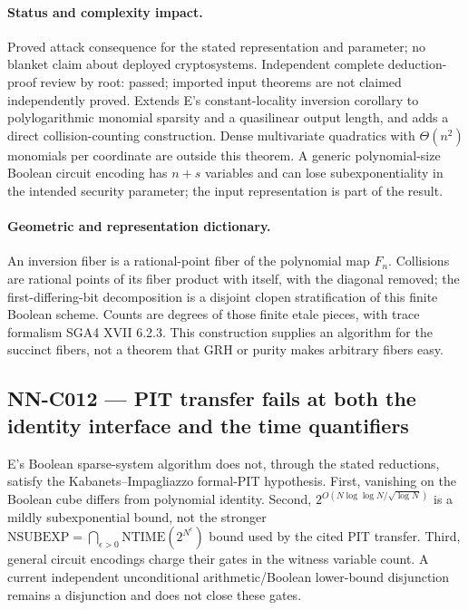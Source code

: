 \paragraph{Status and complexity impact.}
Proved attack consequence for the stated representation and parameter; no blanket claim about deployed cryptosystems. Independent complete deduction-proof review by root: passed; imported input theorems are not claimed independently proved. Extends E's constant-locality inversion corollary to polylogarithmic monomial sparsity and a quasilinear output length, and adds a direct collision-counting construction. Dense multivariate quadratics with $\Theta(n^2)$ monomials per coordinate are outside this theorem. A generic polynomial-size Boolean circuit encoding has $n+s$ variables and can lose subexponentiality in the intended security parameter; the input representation is part of the result.

\paragraph{Geometric and representation dictionary.}
An inversion fiber is a rational-point fiber of the polynomial map $F_n$. Collisions are rational points of its fiber product with itself, with the diagonal removed; the first-differing-bit decomposition is a disjoint clopen stratification of this finite Boolean scheme. Counts are degrees of those finite etale pieces, with trace formalism SGA4 XVII 6.2.3. This construction supplies an algorithm for the succinct fibers, not a theorem that GRH or purity makes arbitrary fibers easy.

\subsection{NN-C012 --- PIT transfer fails at both the identity interface and the time quantifiers}
\begin{proposition}[NN-C012]
E's Boolean sparse-system algorithm does not, through the stated reductions, satisfy the Kabanets--Impagliazzo formal-PIT hypothesis. First, vanishing on the Boolean cube differs from polynomial identity. Second, $2^{O(N\log\log N/\sqrt{\log N})}$ is a mildly subexponential bound, not the stronger $\mathrm{NSUBEXP}=\bigcap_{\epsilon>0}\mathrm{NTIME}(2^{N^\epsilon})$ bound used by the cited PIT transfer. Third, general circuit encodings charge their gates in the witness variable count. A current independent unconditional arithmetic/Boolean lower-bound disjunction remains a disjunction and does not close these gates.
\end{proposition}
